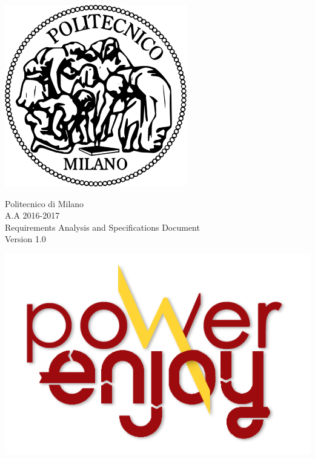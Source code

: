 \documentclass[11pt]{article}
\begin{document}
		 
	 \begin{center}
 	 	\includegraphics[scale=0.5]{Images/PolimiLogo.png}
	 \end{center}

	 \begin{center}
	 	{\Huge Politecnico di Milano}\\
	 	\vspace{5mm}
		{\Large A.A 2016-2017} 
		\vspace{5mm}\\
		{\huge Requirements Analysis and Specifications Document}   
		\vspace{5mm}\\
		{\large Version 1.0}  
     \end{center}
     
     \begin{center}
 	 	\includegraphics[scale=1]{Images/logoPowerEnjoy.png}\\
	 \end{center}
	 	\vspace{5mm}
	
\end{document}
